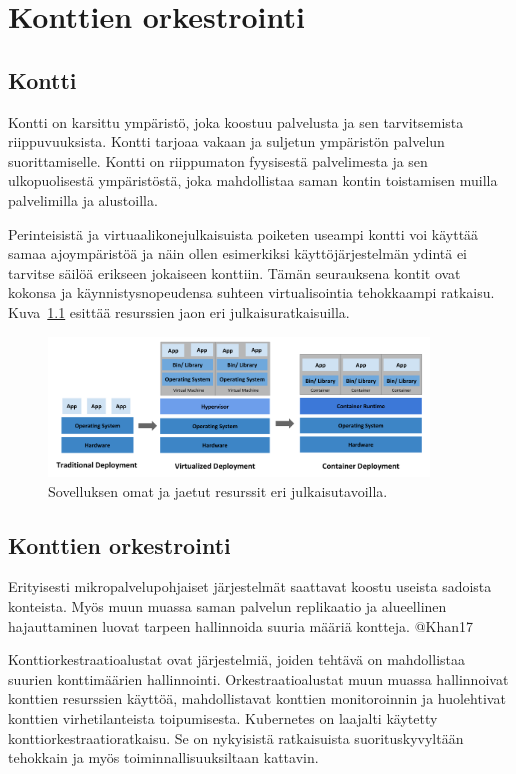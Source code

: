 \chapter{Konttien orkestrointi\label{orchestration}}

\section{Kontti}

Kontti on karsittu ympäristö, joka koostuu palvelusta ja sen tarvitsemista riippuvuuksista. Kontti tarjoaa vakaan ja suljetun ympäristön palvelun suorittamiselle. Kontti on riippumaton fyysisestä palvelimesta ja sen ulkopuolisestä ympäristöstä, joka mahdollistaa saman kontin toistamisen muilla palvelimilla ja alustoilla. \cite{Jabbari16}

Perinteisistä ja virtuaalikonejulkaisuista poiketen useampi kontti voi käyttää samaa ajoympäristöä ja näin ollen esimerkiksi käyttöjärjestelmän ydintä ei tarvitse säilöä erikseen jokaiseen konttiin. Tämän seurauksena kontit ovat kokonsa ja käynnistysnopeudensa suhteen virtualisointia tehokkaampi ratkaisu. Kuva~\ref{fig:container} esittää resurssien jaon eri julkaisuratkaisuilla. \cite{Dua14}

\begin{figure}[ht]
\begin{center}
\includegraphics[width=0.9\textwidth]{figures/container_evolution.png}
\caption{Sovelluksen omat ja jaetut resurssit eri julkaisutavoilla.\cite{Kubernetes23}\label{fig:container}}
\end{center}
\end{figure}

\section{Konttien orkestrointi}

Erityisesti mikropalvelupohjaiset järjestelmät saattavat koostu useista sadoista konteista. Myös muun muassa saman palvelun replikaatio ja alueellinen hajauttaminen luovat tarpeen hallinnoida suuria määriä kontteja. @Khan17

Konttiorkestraatioalustat ovat järjestelmiä, joiden tehtävä on mahdollistaa suurien konttimäärien hallinnointi. Orkestraatioalustat muun muassa hallinnoivat konttien resurssien käyttöä, mahdollistavat konttien monitoroinnin ja huolehtivat konttien virhetilanteista toipumisesta. Kubernetes on laajalti käytetty konttiorkestraatioratkaisu. Se on nykyisistä ratkaisuista suorituskyvyltään tehokkain ja myös toiminnallisuuksiltaan kattavin. \cite{Khan17, Jawarneh19}
